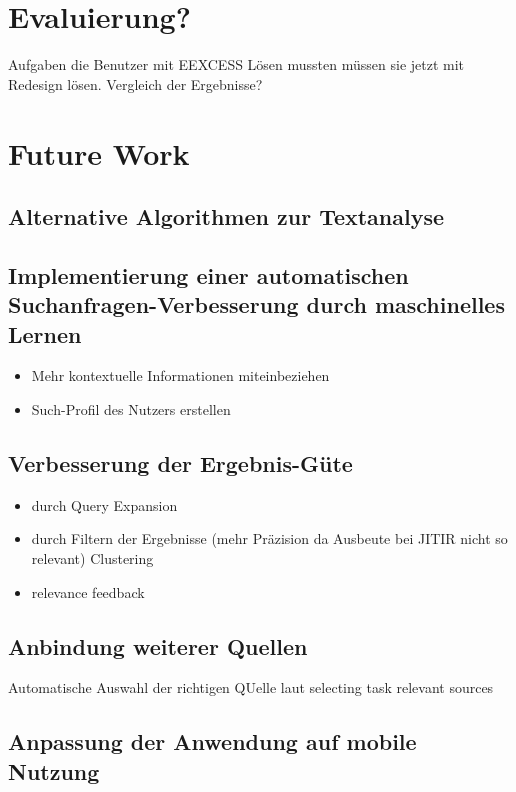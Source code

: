 \section{Evaluierung?}
Aufgaben die Benutzer mit EEXCESS Lösen mussten müssen sie jetzt mit Redesign lösen. Vergleich der Ergebnisse?

\section{Future Work}
 \subsection{Alternative Algorithmen zur Textanalyse}
 \subsection{Implementierung einer automatischen Suchanfragen-Verbesserung durch maschinelles Lernen}
 	\begin{itemize}
 		\item Mehr kontextuelle Informationen miteinbeziehen
 		\item Such-Profil des Nutzers erstellen

 	\end{itemize}
 \subsection{Verbesserung der Ergebnis-Güte}
	\begin{itemize}
		\item durch Query Expansion
 		\item durch Filtern der Ergebnisse (mehr Präzision da Ausbeute bei JITIR nicht so relevant) Clustering
 		\item relevance feedback
	\end{itemize}
\subsection{Anbindung weiterer Quellen}
	Automatische Auswahl der richtigen QUelle laut selecting task relevant sources
 \subsection{Anpassung der Anwendung auf mobile Nutzung}

